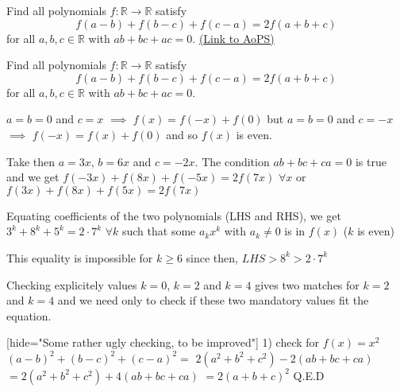 \begin{problem}
	Find all polynomials $ f: \mathbb{R} \to \mathbb{R}$ satisfy \[ f(a-b) + f(b-c) + f(c-a) = 2f(a+b+c)\]
for all $ a,b,c \in \mathbb{R}$ with $ ab+bc+ac = 0$.
	\flushright \href{https://artofproblemsolving.com/community/c6h277054}{(Link to AoPS)}
\end{problem}



\begin{solution}
	\begin{tcolorbox}Find all polynomials $ f: \mathbb{R} \to \mathbb{R}$ satisfy
\[ f(a - b) + f(b - c) + f(c - a) = 2f(a + b + c)
\]
for all $ a,b,c \in \mathbb{R}$ with $ ab + bc + ac = 0$.\end{tcolorbox}

$ a = b = 0$ and $ c = x$ $ \implies$ $ f(x) = f( - x) + f(0)$ but $ a = b = 0$ and $ c = - x$ $ \implies$ $ f( - x) = f(x) + f(0)$ and so $ f(x)$ is even.

Take then $ a = 3x$, $ b = 6x$ and $ c = - 2x$. The condition $ ab + bc + ca = 0$ is true and we get $ f( - 3x) + f(8x) + f( - 5x) = 2f(7x)$ $ \forall x$ or $ f(3x) + f(8x) + f(5x) = 2f(7x)$

Equating coefficients of the two polynomials (LHS and RHS), we get $ 3^k + 8^k + 5^k = 2\cdot 7^k$ $ \forall k$ such that some $ a_kx^k$ with $ a_k\neq 0$ is in $ f(x)$ ($ k$ is even)

This equality is impossible for $ k\geq 6$ since then, $ LHS > 8^k > 2\cdot 7^k$

Checking explicitely values $ k = 0$, $ k = 2$ and $ k = 4$ gives two matches for $ k = 2$ and $ k = 4$ and we need only to check if these two mandatory values fit the equation.

[hide="Some rather ugly checking, to be improved"]
1) check for $ f(x) = x^2$
$ (a - b)^2 + (b - c)^2 + (c - a)^2 =$ $ 2(a^2 + b^2 + c^2) - 2(ab + bc + ca)$ $ = 2(a^2 + b^2 + c^2) + 4(ab + bc + ca)$ $ = 2(a + b + c)^2$
Q.E.D


\end{solution}

